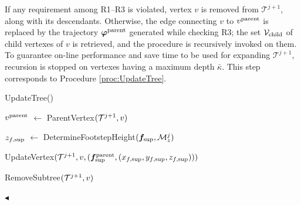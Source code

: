 If any requirement among R1--R3 is violated, vertex $v$ is removed from $\mathcal{T}^{j+1}$, along with its descendants.
Otherwise, the edge connecting $v$ to $v^{\rm parent}$ is replaced by the trajectory ${\bm{\varphi}}^{\rm parent}$ generated while checking R3; the set ${\cal V}_{\rm child}$ of child vertexes of $v$ is retrieved, and the procedure is recursively invoked on them. 
To guarantee on-line performance and save time to be used for expanding $\mathcal{T}^{j+1}$, recursion is stopped on vertexes having a maximum depth $\bar{\kappa}$.
This step corresponds to Procedure \ref{proc:UpdateTree}.
\begin{procedure}%
	\small
	\removelatexerror
	
    \caption{UpdateTree()}
	\label{proc:UpdateTree}

	\vspace{2pt}
    \BlankLine
	
	$v^{\rm parent}$ $\leftarrow$ ParentVertex$({\cal T}^{j+1}, v)$\;
    
    $z_{f, \rm sup}$ $\leftarrow$ DetermineFootstepHeight$({\bm{f}}_{\rm sup}, {\cal M}_z^j)$\;
    
    UpdateVertex$({\cal T}^{j+1}, v, ({\bm{f}}_{\rm sup}^{\rm parent}, (x_{f, \rm sup}, y_{f, \rm sup}, z_{f, \rm sup})))$\;
    
	{
 	    RemoveSubtree$({\cal T}^{j+1}, v)$\; 	
 	}
	 
    \Return\;   
	
\end{procedure}
\hfill $\blacktriangleleft$

